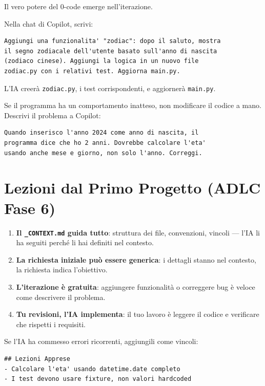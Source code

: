 Il vero potere del 0-code emerge nell'iterazione.

\begin{praticabox}[title={Pratica --- Aggiungere una funzionalità}]
Nella chat di Copilot, scrivi:
\begin{lstlisting}[language={}]
Aggiungi una funzionalita' "zodiac": dopo il saluto, mostra
il segno zodiacale dell'utente basato sull'anno di nascita
(zodiaco cinese). Aggiungi la logica in un nuovo file
zodiac.py con i relativi test. Aggiorna main.py.
\end{lstlisting}
L'IA creerà \texttt{zodiac.py}, i test corrispondenti, e aggiornerà \texttt{main.py}.
\end{praticabox}

\begin{praticabox}[title={Pratica --- Correggere un bug}]
Se il programma ha un comportamento inatteso, non modificare il codice a mano. Descrivi il problema a Copilot:
\begin{lstlisting}[language={}]
Quando inserisco l'anno 2024 come anno di nascita, il
programma dice che ho 2 anni. Dovrebbe calcolare l'eta'
usando anche mese e giorno, non solo l'anno. Correggi.
\end{lstlisting}
\end{praticabox}

\section{Lezioni dal Primo Progetto (ADLC Fase 6)}

\begin{enumerate}
  \item \textbf{Il \texttt{\_CONTEXT.md} guida tutto}: struttura dei file, convenzioni, vincoli --- l'IA li ha seguiti perché li hai definiti nel contesto.
  \item \textbf{La richiesta iniziale può essere generica}: i dettagli stanno nel contesto, la richiesta indica l'obiettivo.
  \item \textbf{L'iterazione è gratuita}: aggiungere funzionalità o correggere bug è veloce come descrivere il problema.
  \item \textbf{Tu revisioni, l'IA implementa}: il tuo lavoro è leggere il codice e verificare che rispetti i requisiti.
\end{enumerate}

\begin{praticabox}[title={Pratica --- Aggiorna il contesto}]
Se l'IA ha commesso errori ricorrenti, aggiungili come vincoli:
\begin{lstlisting}[language={}]
## Lezioni Apprese
- Calcolare l'eta' usando datetime.date completo
- I test devono usare fixture, non valori hardcoded
\end{lstlisting}
\end{praticabox}

